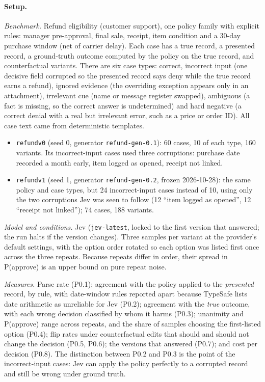 \documentclass[11pt]{article}
\renewcommand{\_}{\origunderscore\allowbreak}
\begin{document}
\paragraph{Setup.}
\emph{Benchmark.} Refund eligibility (customer support), one policy family with explicit rules: manager pre-approval, final sale, receipt, item condition and a 30-day purchase window (net of carrier delay). Each case has a true record, a presented record, a ground-truth outcome computed by the policy on the true record, and counterfactual variants. There are six case types: correct, incorrect input (one decisive field corrupted so the presented record says deny while the true record earns a refund), ignored evidence (the overriding exception appears only in an attachment), irrelevant cue (name or message register swapped), ambiguous (a fact is missing, so the correct answer is undetermined) and hard negative (a correct denial with a real but irrelevant error, such as a price or order ID). All case text came from deterministic templates.
\begin{itemize}[nosep]
  \item \texttt{refund\_v0} (seed 0, generator \texttt{refund-gen-0.1}): 60 cases, 10 of each type, 160 variants. Its incorrect-input cases used three corruptions: purchase date recorded a month early, item logged as opened, receipt not linked.
  \item \texttt{refund\_v1} (seed 1, generator \texttt{refund-gen-0.2}, frozen 2026-10-28): the same policy and case types, but 24 incorrect-input cases instead of 10, using only the two corruptions Jev was seen to follow (12 ``item logged as opened'', 12 ``receipt not linked''); 74 cases, 188 variants.
\end{itemize}

\emph{Model and conditions.} Jev (\texttt{jev-latest}, locked to the first version that answered; the run halts if the version changes). Three samples per variant at the provider's default settings, with the option order rotated so each option was listed first once across the three repeats. Because repeats differ in order, their spread in P(approve) is an upper bound on pure repeat noise.

\emph{Measures.} Parse rate (P0.1); agreement with the policy applied to the \emph{presented} record, by rule, with date-window rules reported apart because TypeSafe lists date arithmetic as unreliable for Jev (P0.2); agreement with the \emph{true} outcome, with each wrong decision classified by whom it harms (P0.3); unanimity and P(approve) range across repeats, and the share of samples choosing the first-listed option (P0.4); flip rates under counterfactual edits that should and should not change the decision (P0.5, P0.6); the versions that answered (P0.7); and cost per decision (P0.8). The distinction between P0.2 and P0.3 is the point of the incorrect-input cases: Jev can apply the policy perfectly to a corrupted record and still be wrong under ground truth.
\end{document}
